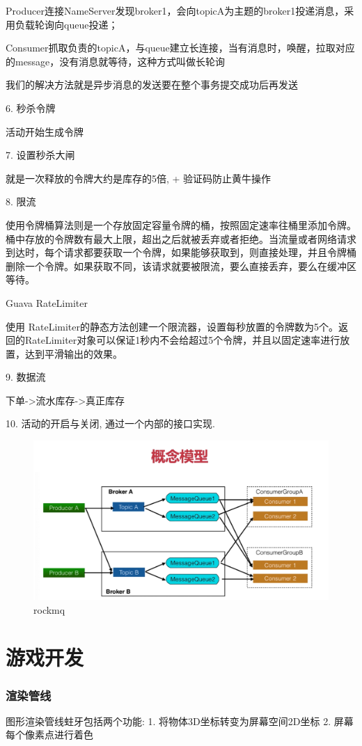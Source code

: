 \documentclass[UTF8]{ctexart}
\begin{document}
Producer连接NameServer发现broker1，会向topicA为主题的broker1投递消息，采用负载轮询向queue投递；

Consumer抓取负责的topicA，与queue建立长连接，当有消息时，唤醒，拉取对应的message，没有消息就等待，这种方式叫做长轮询

我们的解决方法就是异步消息的发送要在整个事务提交成功后再发送

6. 秒杀令牌

活动开始生成令牌

7. 设置秒杀大闸

就是一次释放的令牌大约是库存的5倍, + 验证码防止黄牛操作

8. 限流

使用令牌桶算法则是一个存放固定容量令牌的桶，按照固定速率往桶里添加令牌。桶中存放的令牌数有最大上限，超出之后就被丢弃或者拒绝。当流量或者网络请求到达时，每个请求都要获取一个令牌，如果能够获取到，则直接处理，并且令牌桶删除一个令牌。如果获取不同，该请求就要被限流，要么直接丢弃，要么在缓冲区等待。

Guava RateLimiter


使用 RateLimiter的静态方法创建一个限流器，设置每秒放置的令牌数为5个。返回的RateLimiter对象可以保证1秒内不会给超过5个令牌，并且以固定速率进行放置，达到平滑输出的效果。

9. 数据流

下单->流水库存->真正库存


10. 活动的开启与关闭, 通过一个内部的接口实现.



\begin{figure}
	\centering
	\includegraphics[width=0.7\linewidth]{figures/rockmq.png}
	\caption{rockmq}
	\label{fig:rockmq}
\end{figure}

\section{游戏开发}
\subsubsection{渲染管线}
图形渲染管线蛀牙包括两个功能:
1. 将物体3D坐标转变为屏幕空间2D坐标
2. 屏幕每个像素点进行着色
\end{document}
